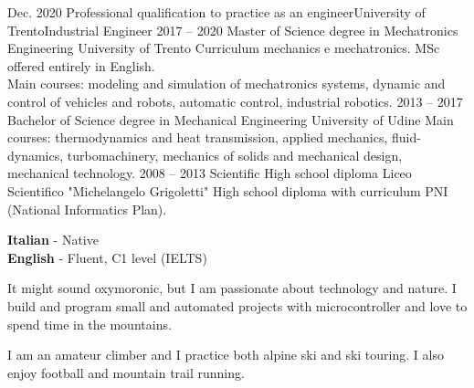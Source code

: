 \documentclass[9pt]{developercv_mattia} %
\begin{document}
%
%
%
\begin{entrylist}
	\entry
		{Dec. 2020}
		{Professional qualification to practice as an engineer}{University of Trento}{Industrial Engineer}
	\entry
		{2017 -- 2020}
		{Master of Science degree in Mechatronics Engineering}
		{University of Trento}
		{Curriculum mechanics e mechatronics. MSc offered entirely in English.\\
		Main courses: modeling and simulation of mechatronics systems, dynamic and control of vehicles and robots, automatic control, industrial robotics.}
	\entry
		{2013 -- 2017}
		{Bachelor of Science degree in Mechanical Engineering}
		{University of Udine}
		{Main courses: thermodynamics and heat transmission, applied mechanics, fluid-dynamics, turbomachinery, mechanics of solids and mechanical design, mechanical technology.} %
	\entry
		{2008 -- 2013}
		{Scientific High school diploma}
		{Liceo Scientifico "Michelangelo Grigoletti"}
		{High school diploma with curriculum PNI (National Informatics Plan). } %
\end{entrylist}
%
%
\begin{minipage}[t]{0.27\textwidth}
	\vspace{-\baselineskip} %
%
	\textbf{Italian} - Native\\
	\textbf{English}  - Fluent, C1 level (IELTS)
%
\end{minipage}
\hfill
\begin{minipage}[t]{0.38\textwidth}
	\vspace{-\baselineskip} %
	It might sound oxymoronic, but I am passionate about technology and nature. 
	I build and program small and automated projects with microcontroller and love to spend time in the mountains.
%
\end{minipage}
\hfill
\begin{minipage}[t]{0.27\textwidth}
	\vspace{-\baselineskip} %
%
	I am an amateur climber and I practice both alpine ski and ski touring. I also enjoy football and mountain trail running. 
%
\end{minipage}

\vfill
\end{document}
